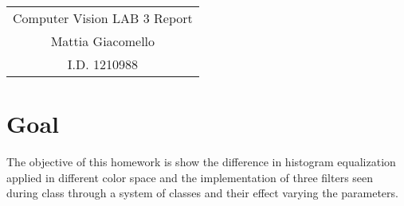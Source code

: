 \documentclass[11pt,a4paper]{article}
\begin{document}
\begin{center}
\begin{tabular}{c}
\LARGE{Computer Vision LAB 3 Report}\\
\large{Mattia Giacomello}\\
I.D. 1210988
\end{tabular}
\end{center}

\section{Goal}
The objective of this homework is show the difference in histogram equalization applied in different color space and the implementation of three filters seen during class through a system of classes and their effect varying the parameters.
\end{document}
